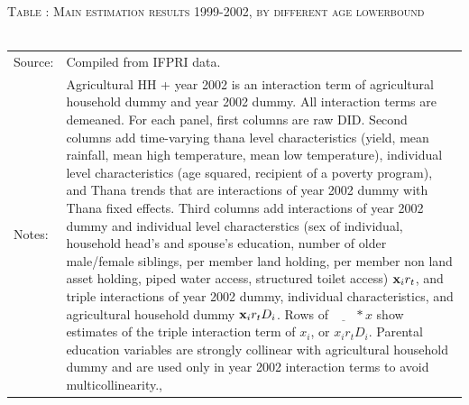 \documentclass[12pt,letterpaper]{article}
\newcommand{\bfx}{\ensuremath{\mbox{\bf x}}}
\newcommand{\0}{\ensuremath{\mbox{\boldmath $0$}}}
\begin{document}
{\begin{table}\hfil\textsc{\footnotesize Table \thetable: Main estimation results 1999-2002, by different age lowerbound\label{MainByGenderByAgeLBResults}}\\\setlength{\tabcolsep}{.5pt}\renewcommand{\arraystretch}{.675}\hspace{-2em}\hfil\\\renewcommand{\arraystretch}{1}\hfil\begin{tabular}{>{\hfill\scriptsize}p{1cm}<{}>{\scriptsize}p{12cm}<{\hfill}} Source:& Compiled from IFPRI data. \\[-1ex] Notes:&   \textsf{Agricultural HH + year 2002} is an interaction term of agricultural household dummy and year 2002 dummy. All interaction terms are demeaned. For each panel, first columns are raw DID. Second columns add time-varying thana level characteristics (yield, mean rainfall, mean high temperature, mean low temperature), individual level characteristics (age squared, recipient of a poverty program), and \textsf{Thana trends} that are interactions of year 2002 dummy with Thana fixed effects. Third columns add interactions of year 2002 dummy and individual level characterstics (sex of individual, household head's and spouse's education, number of older male/female siblings, per member land holding, per member non land asset holding, piped water access, structured toilet access) $\bfx_{i}r_{t}$, and triple interactions of year 2002 dummy, individual characteristics, and agricultural household dummy $\bfx_{i}r_{t}D_{i}$. Rows of $\underline{\phantom{mm}}*x$ show estimates of the triple interaction term of $x_{i}$, or $x_{i}r_{t}D_{i}$. Parental education variables are strongly collinear with agricultural household dummy and are used only in year 2002 interaction terms to avoid multicollinearity., \\   \end{tabular} \end{table}


}
\end{document}
